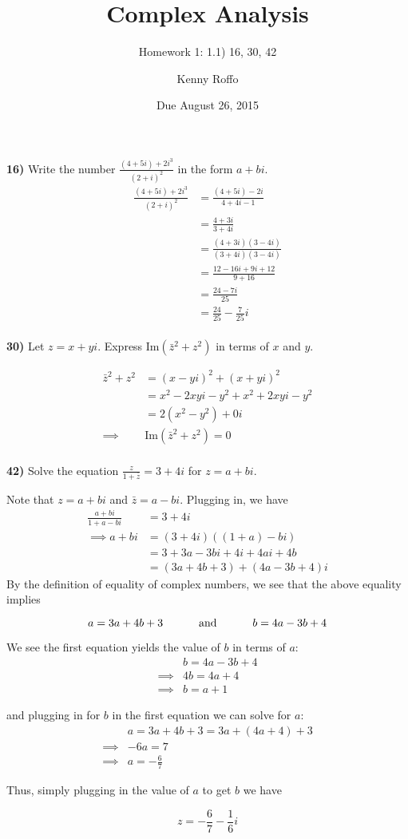 \documentclass{scrartcl}
\title{Complex Analysis}
\subtitle{Homework 1: 1.1) 16, 30, 42}
\author{Kenny Roffo}
\date{Due August 26, 2015}
\begin{document}
\maketitle
\textbf{16)} Write the number $\frac{(4+5i)+2i^3}{(2+i)^2}$ in the form $a+bi$.\\

\begin{align*}
  \frac{(4+5i)+2i^3}{(2+i)^2} &= \frac{(4 + 5i) - 2i}{4 + 4i - 1}\\
  &= \frac{4+3i}{3+4i}\\
  &= \frac{(4+3i)(3-4i)}{(3+4i)(3-4i)}\\
  &= \frac{12-16i+9i+12}{9+16}\\
  &= \frac{24-7i}{25}\\
  &= \frac{24}{25}-\frac{7}{25}i
\end{align*}\\

\textbf{30)} Let $z=x+yi$. Express $\text{Im}(\bar{z}^2 + z^2)$ in terms of $x$ and $y$.

\begin{align*}
  \bar{z}^2 + z^2 &= (x-yi)^2 + (x+yi)^2\\
  &= x^2 - 2xyi - y^2 + x^2 + 2xyi - y^2\\
  &= 2(x^2 - y^2) + 0i\\
  \implies &\text{Im}(\bar{z}^2 + z^2) = 0
\end{align*}\\

\pagebreak
\textbf{42)} Solve the equation $\frac{z}{1+\bar{z}}=3+4i$ for $z=a+bi$.

Note that $z=a+bi$ and $\bar{z}=a-bi$. Plugging in, we have
\begin{align*}
  \frac{a+bi}{1+a-bi} &= 3+4i\\
  \implies a+bi &= (3+4i)((1+a)-bi)\\
  &= 3+3a-3bi+4i+4ai+4b\\
  &= (3a+4b+3)+(4a-3b+4)i
\end{align*}
By the definition of equality of complex numbers, we see that the above equality implies

$$a=3a+4b+3 \text{\hspace{0.4in} and \hspace{0.4in}} b=4a-3b+4$$

We see the first equation yields the value of $b$ in terms of $a$:
\begin{align*}
  &b = 4a-3b+4\\
  \implies &4b = 4a+4\\
  \implies &b = a+1
\end{align*}

and plugging in for $b$ in the first equation we can solve for $a$:
\begin{align*}
  &a = 3a+4b+3 = 3a+(4a+4)+3\\
  \implies &-6a = 7\\
  \implies &a = -\frac{6}{7}
\end{align*}

Thus, simply plugging in the value of $a$ to get $b$ we have

$$z=-\frac{6}{7}-\frac{1}{6}i$$
\end{document}
